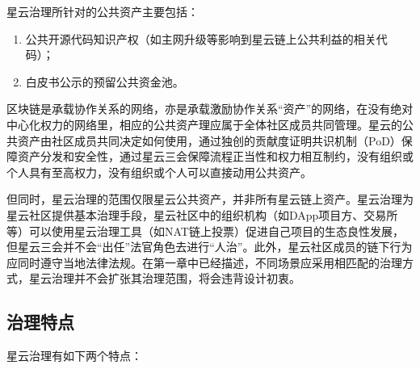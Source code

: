 星云治理所针对的公共资产主要包括：

\begin{enumerate}
	\item 公共开源代码知识产权（如主网升级等影响到星云链上公共利益的相关代码）；
	\item 白皮书公示的预留公共资金池。
\end{enumerate}

区块链是承载协作关系的网络，亦是承载激励协作关系“资产”的网络，在没有绝对中心化权力的网络里，相应的公共资产理应属于全体社区成员共同管理。星云的公共资产由社区成员共同决定如何使用，通过独创的贡献度证明共识机制（PoD）保障资产分发和安全性，通过星云三会保障流程正当性和权力相互制约，没有组织或个人具有至高权力，没有组织或个人可以直接动用公共资产。

但同时，星云治理的范围仅限星云公共资产，并非所有星云链上资产。星云治理为星云社区提供基本治理手段，星云社区中的组织机构（如DApp项目方、交易所等）可以使用星云治理工具（如NAT链上投票）促进自己项目的生态良性发展，但星云三会并不会“出任”法官角色去进行“人治”。此外，星云社区成员的链下行为应同时遵守当地法律法规。在第一章中已经描述，不同场景应采用相匹配的治理方式，星云治理并不会扩张其治理范围，将会违背设计初衷。

\subsection{治理特点}

星云治理有如下两个特点：

